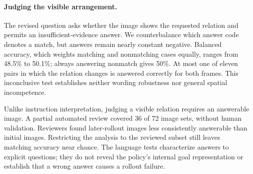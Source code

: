 \documentclass{article}
\begin{document}
\paragraph{Judging the visible arrangement.}
The revised question asks whether the image shows the requested relation and permits an insufficient-evidence answer. We counterbalance which answer code denotes a match, but answers remain nearly constant negative. Balanced accuracy, which weights matching and nonmatching cases equally, ranges from 48.5\% to 50.1\%; always answering nonmatch gives 50\%. At most one of eleven pairs in which the relation changes is answered correctly for both frames. This inconclusive test establishes neither wording robustness nor general spatial incompetence.

Unlike instruction interpretation, judging a visible relation requires an answerable image. A partial automated review covered 36 of 72 image sets, without human validation. Reviewers found later-rollout images less consistently answerable than initial images. Restricting the analysis to the reviewed subset still leaves matching accuracy near chance. The language tests characterize answers to explicit questions; they do not reveal the policy's internal goal representation or establish that a wrong answer causes a rollout failure.
\end{document}
